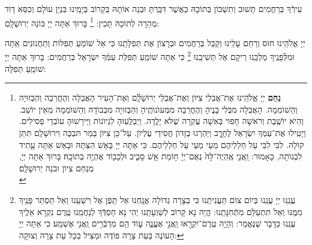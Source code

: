 \documentclass[twoside, openany, parskip=half, 11pt]{book}
\begin{document}
 עִירְֿךָ בְּרַחֲמִים תָּשׁוּב וְתִשְׁכּוֹן בְּתוֹכָהּ כַּאֲשֶׁר דִּבַּֽרְתָּ וּבְנֵה אוֹתָהּ בְּקָרוֹב בְּיָמֵֽינוּ בִּנְיַן עוֹלָם וְכִסֵּא דָוִד מְהֵרָה לְתוֹכָהּ תָּכִין: 
 \footnote{
\textbf{נַחֵם}
 יְיָ אֱלֹהֵֽינוּ אֶת־אֲבֵלֵי צִיּוֺן וְאֶת־אֲבֵלֵי יְרוּשָׁלַֽ֔֗͏ִם וְאֶת־הָעִיר הָאֲבֵלָה וְהֶחֳרֵבָה וְהַבְּזוּיָה וְהַשׁוֺמֵמָה. הָאֲבֵלָה מִבְּלִי בָנֱיהָ וְהֶחֳרֵבָה מִמְּעוֺנוֺתֶֽיהָ וְהַבְּזוּיָה מִכְּבוֺדָהּ וְהַשׁוֺמֵמָה מֵאֵין יוֺשֵׁב. וְהִיא יוֺשֶֽׁבֶת וְרֹאשָׁה חָפוּי בְּאִשָׁה עֲקַרָה שֶׁלֹּא יָלֳדָה. וַיְבַלְְּעֽוּהָ לִגְיוֺנוֺת וַיְּירָשׁוּהָ עוֺבְדֵי פְסִילִים. וַיָטִֽילוּ אֶת־עַמְּךָ יִשְׂרָאֵל לֶחָרֱֽב וַיַּהַרְגוּ בְזָדוֺן חֲסִידֵי עֶלְיוֺן. עַל־כֵּן צִיּוֺן בְּמַר תּבְכֶּה וִירוּשָׁלַֽ͏ִם תִּתֵּן קוֺלָהּ. לִבִּי לִבִּי עַל חַלְלֵיהֶם מֵעַי מֵעַי עַל חַלְלֵיהֶם. כִּי אַתָּה יְיָ בָּאֵשׁ הִצַּתָּהּ וּבָאֵשׁ אַתָּה עָָתִיד לִבְנוֺתָה, כָּאָמוּר:  וַֽאֲנִ֤י אֶֽהְיֶה־לָּהּ֙ נְאֻם־יְיָ֔ ח֥וֹמַת אֵ֖שׁ סָבִ֑יב וּלְכָב֖וֹד אֶהְיֶ֥ה בְתוֹכָֽהּ׃
  בָּרוּךְ אַתָּה יְיָ, מְנַחֵם צִיוֺן וּבֹנֵה יְרוּשָׁלַֽ͏ִם׃ \\
}
 בָּרוּךְ אַתָּה יְיָ בּוֹנֵה יְרוּשָׁלָֽםִ:

\weekdaysamalchus

 יְיָ אֱלֹהֵֽינוּ חוּס וְרַחֵם עָלֵֽינוּ וְקַבֵּל בְּרַחֲמִים וּבְרָצוֹן אֶת תְּפִלָּתֵֽנוּ כִּי אֵל שׁוֹמֵעַ תְּפִלּוֹת וְתַחֲנוּנִים אַֽתָּה וּמִלְּֿפָנֶֽיךָ מַלְכֵּֽנוּ רֵיקָם אַל תְּשִׁיבֵֽנוּ
\footnote{
עֲנֵֽנוּ יְיָ עֲנֵֽנוּ בְּיוֹם צוֹם תַּעֲנִיתֵֽנוּ כִּי בְצָרָה גְדוֹלָה אֲנָֽחְנוּ אַל תֵּֽפֶן אֶל רִשְׁעֵֽנוּ וְאַל תַּסְתֵּר פָּנֶֽיךָ מִמֶּֽנּוּ וְאַל תִּתְעַלַּם מִתְּֿחִנָּתֵֽנוּ: הֱיֵה נָא קָרוֹב לְשַׁוְעָתֵֽנוּ יְהִי נָא חַסְדְּֿךָ לְנַחֲמֵֽנוּ טֶֽרֶם נִקְרָא אֵלֶֽיךָ עֲנֵֽנוּ כַּדָּבָר שֶׁנֶּאֱמַר:
 וְהָיָ֥ה טֶֽרֶם־יִקְרָ֖אוּ וַֽאֲנִ֣י אֶעֱנֶ֑ה ע֛וֹד הֵ֥ם מְדַבְּֿרִ֖ים וַֽאֲנִ֥י אֶשְׁמָֽע׃ כִּי אַתָּה יְיָ הָעוֹנֶה בְּעֵת צָרָה פּוֹדֶה וּמַצִּיל בְּכָל עֵת צָרָה וְצוּקָה:
}
 כִּי אַתָּה שׁוֹמֵֽעַ תְּפִלַּת עַמְּֿךָ יִשְׂרָאֵל בְּרַחֲמִים: בָּרוּךְ אַתָּה יְיָ שׁוֹמֵֽעַ תְּפִלָּה:

\retzeh

\yaalehveyavo

\zion

\modim

\clearpage

\alhanisim

\weekdaysahodos

\clearpage
\end{document}
